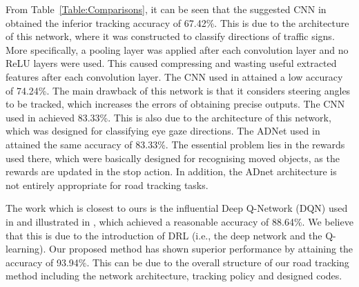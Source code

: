 \documentclass{svproc}
\begin{document}
From Table~\ref{Table:Comparisons}, it can be seen that the suggested CNN in \cite{Karaduman2017Deep} obtained the inferior tracking accuracy of 67.42\%. This is due to the architecture of this network, where it was constructed to classify directions of traffic signs. More specifically, a pooling layer was applied after each convolution layer and no ReLU layers were used. This caused compressing and wasting useful extracted features after each convolution layer. 
%
The CNN used in \cite{bojarski2016end} attained a low accuracy of 74.24\%. The main drawback of this network is that it considers steering angles to be tracked, which increases the errors of obtaining precise outputs. 
%
The CNN used in \cite{George2016Real} achieved 83.33\%. This is also due to the architecture of this network, which was designed for classifying eye gaze directions. 
%
The ADNet used in \cite{Yun2017Action,Yun2018Action} attained the same accuracy of 83.33\%. The essential problem  lies in the rewards used there, which were basically designed %
for recognising moved objects, as the rewards are updated in the stop action. In addition, the ADnet architecture is not entirely appropriate for road tracking tasks. 


The work which is closest to ours is the influential Deep Q-Network (DQN) used in \cite{mnih2015human} and illustrated in \cite{arulkumaran2017brief}, which achieved a reasonable accuracy of 88.64\%. We believe that this is due to the %
introduction of DRL (i.e., the deep network and the Q-learning). 
Our proposed method has shown superior performance by attaining the accuracy of 93.94\%. This can be due to the overall structure of our road tracking method including the network architecture, tracking policy and designed codes.
\end{document}
